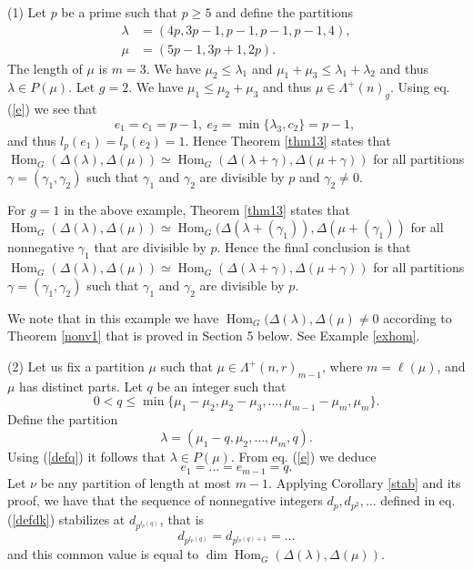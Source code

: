 \documentclass[ALCO,Unicode]{cedram}
\newcommand{\m}{\mu}
\newcommand{\la}{\lambda}
\newcommand{\La}{\Lambda}
\DeclareMathOperator{\Hom}{Hom}
\numberwithin{equation}{section}
\begin{document}
	\begin{exams}\label{rem14} (1) Let $p$ be a prime such that $p \ge 5$ and define the partitions \begin{align*}\lambda&=(4p, 3p-1, p-1, p-1, p-1, 4), \\ \mu &=(5p-1, 3p+1, 2p). \end{align*} The length of $\mu$ is $m=3$.  We have $\mu_2 \le \lambda_1$ and $\mu_1+\mu_3 \le \lambda_1 + \lambda_2$ and thus $\lambda \in P(\mu)$. Let $g=2$. We have $\mu_1 \le \mu_2+\mu_3$ and thus $\mu \in \La^+(n)_g$. Using eq. (\ref{e}) we see that \[
			e_1 = c_1=p-1, \ e_2 = \min\{\lambda_3, c_2\}=p-1,\  
			\]
	and thus $l_p(e_1)=l_p(e_2)=1$. Hence Theorem \ref{thm13} states that $\Hom_G(\Delta(\la),\Delta(\mu)) \simeq \Hom_{G}(\Delta(\la+\gamma), \Delta(\mu+\gamma))$ for all partitions $\gamma=(\gamma_1, \gamma_2)$ such that $\gamma_1$ and $\gamma_2$ are divisible by $p$ and $\gamma_2 \neq 0$.
	
	For $g=1$ in the above example, Theorem \ref{thm13} states that $\Hom_G(\Delta(\la),\Delta(\mu)) \simeq \Hom_{G}(\Delta(\la+(\gamma_1)), \Delta(\mu+(\gamma_1))$ for all nonnegative $\gamma_1$ that are divisible by $p$. Hence the final conclusion is that $\Hom_G(\Delta(\la),\Delta(\mu)) \simeq \Hom_{G}(\Delta(\la+\gamma), \Delta(\mu+\gamma))$ for all partitions $\gamma=(\gamma_1, \gamma_2)$ such that $\gamma_1$ and $\gamma_2$ are divisible by $p$.
	
	We note that in this example we have  $\Hom_{G}(\Delta(\la), \Delta(\mu) \neq 0$ according to Theorem \ref{nonv1} that is proved in Section 5 below. See Example \ref{exhom}.
	
	(2)	Let us fix a partition $\mu$ such that $\mu \in \La^+(n,r)_{m-1}$, 	where $m=\ell{(\mu) }$, and $\mu$ has distinct parts. Let $q$ be an integer such that \begin{equation}\label{defq}0 < q \le \min\{\mu_1 - \mu_2, \mu_2 - \mu_3, \dots, \mu_{m-1} - \mu_{m}, \mu_{m}\}.\end{equation}
	Define the partition \begin{equation}\label{deflambda}\lambda =(\m_1-q,\mu_2, \dots, \mu_m, q).\end{equation} Using (\ref{defq}) it follows that $\lambda \in P(\mu)$. From eq. (\ref{e}) we deduce \[e_1 = \dots = e_{m-1}=q.\]
	Let $\nu$ be any partition of length at most $m-1$. Applying Corollary \ref{stab} and its proof, we have that the sequence of nonnegative integers $d_p, d_{p^2}, \dots$ defined in eq. (\ref{defdk}) stabilizes at $\label{eqd}d_{p^{l_p(q)}}$, that is \begin{equation}d_{p^{l_p(q)}} = d_{p^{l_p(q)+1}}= \dots \end{equation}
	and this common value is equal to $\dim \Hom_G(\Delta(\la),\Delta(\mu)).$
	

\end{exams}
\end{document}
